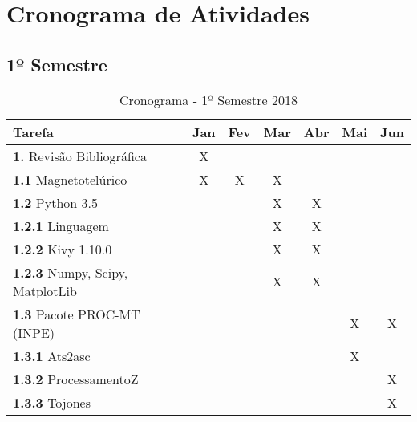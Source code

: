 
\chapter{Cronograma de Atividades}
    \label{cap-cronograma}
    
    
    \section{1º Semestre}
    
    \begin{table}[h]
    \caption{Cronograma - 1º Semestre 2018}
    
    \begin{center}
    \centering
    \begin{tabular}{|l||c|c|c|c|c|c|}
    
    \hline
    {\bf Tarefa}                   		& {\bf Jan}& {\bf Fev}& {\bf Mar}& {\bf Abr}& {\bf Mai}& {\bf Jun}\\  
    \hline
    {\bf 1.} Revisão Bibliográfica 		& 	X  & 	      & 	 & 	    & 	       & 	  \\ 
    \hline
    {\bf 1.1} Magnetotelúrico      		& 	X  & 	X     & X        & 	    & 	       & 	  \\ 
    \hline
    {\bf 1.2} Python 3.5           		& 	   &          & X	 &X 	    & 	       & 	  \\ 
    \hline
    {\bf 1.2.1} Linguagem           		& 	   & 	      & X	 &X 	    & 	       & 	  \\ 
    \hline
    {\bf 1.2.2} Kivy 1.10.0           		& 	   & 	      & X	 & X	    & 	       & 	  \\ 
    \hline
    {\bf 1.2.3} Numpy, Scipy, MatplotLib        & 	   & 	      & X	 & X	    & 	       & 	  \\ 
    \hline
    {\bf 1.3} Pacote PROC-MT (INPE)           	& 	   & 	      & 	 & 	    & X	       & X	  \\ 
    \hline
    {\bf 1.3.1} Ats2asc           		& 	   & 	      & 	 & 	    &X 	       & 	  \\ 
    \hline
    {\bf 1.3.2} ProcessamentoZ           	& 	   & 	      & 	 & 	    & 	       & X	  \\ 
    \hline
    {\bf 1.3.3} Tojones           		& 	   & 	      & 	 & 	    & 	       & X	  \\ 
    \hline
   
    
    
    \end{tabular}
 
   
    \end{center}

    \end{table}

